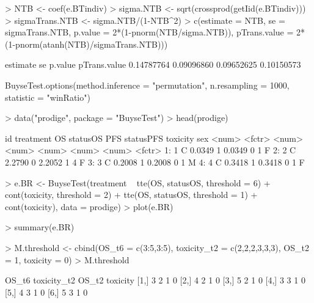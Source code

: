 \documentclass[12pt]{article}
\theoremstyle{definition}
\begin{document}
\begin{Rcode}
> NTB <- coef(e.BTindiv)
> sigma.NTB <- sqrt(crossprod(getIid(e.BTindiv)))
> sigmaTrans.NTB <- sigma.NTB/(1-NTB^2)
> c(estimate = NTB, se = sigmaTrans.NTB, p.value = 2*(1-pnorm(NTB/sigma.NTB)),
    pTrans.value = 2*(1-pnorm(atanh(NTB)/sigmaTrans.NTB)))
\end{Rcode}

\begin{Routput}
  estimate           se      p.value pTrans.value 
0.14787764   0.09096860   0.09652625   0.10150573 
\end{Routput}


\begin{Rcode}
BuyseTest.options(method.inference = "permutation", n.resampling = 1000,
                  statistic = "winRatio")
\end{Rcode}


\begin{Rcode}
> data("prodige", package = "BuyseTest")
> head(prodige)
\end{Rcode}

\begin{Routput}
    id treatment     OS statusOS    PFS statusPFS toxicity    sex
<num>    <fctr>  <num>    <num>  <num>     <num>    <num> <fctr>
1:     1         C 0.0349        1 0.0349         0        1      F
2:     2         C 2.2790        0 2.2052         1        4      F
3:     3         C 0.2008        1 0.2008         0        1      M
4:     4         C 0.3418        1 0.3418         0        1      F
\end{Routput}

\begin{Rcode}
> e.BR <- BuyseTest(treatment ~ tte(OS, statusOS, threshold = 6)
                               + cont(toxicity, threshold = 2) 
                               + tte(OS, statusOS, threshold = 1) 
                               + cont(toxicity), data = prodige)
> plot(e.BR)
\end{Rcode}

\begin{Rcode}
> summary(e.BR)
\end{Rcode}

\begin{Rcode}
> M.threshold <- cbind(OS_t6 = c(3:5,3:5),
                       toxicity_t2 = c(2,2,2,3,3,3),
                       OS_t2 = 1,
                       toxicity = 0)
> M.threshold
\end{Rcode}
\begin{Routput}
     OS_t6 toxicity_t2 OS_t2 toxicity
[1,]     3           2     1        0
[2,]     4           2     1        0
[3,]     5           2     1        0
[4,]     3           3     1        0
[5,]     4           3     1        0
[6,]     5           3     1        0
\end{Routput}
\end{document}
